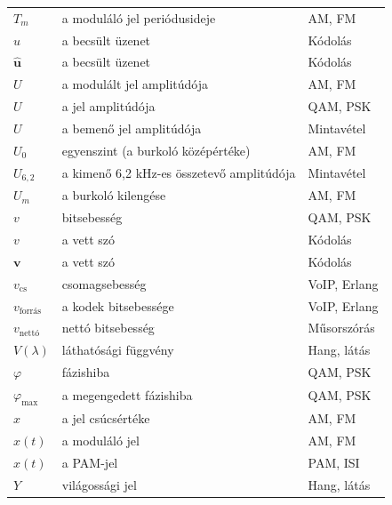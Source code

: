 {\begin{longtable}{@{}>{\raggedright\arraybackslash}p{2.4cm}>{\raggedright\arraybackslash}p{8.2cm}>{\raggedright\arraybackslash}p{3.8cm}@{}}
$T_m$ & a moduláló jel periódusideje & AM, FM\\
$\hat u$ & a becsült üzenet & Kódolás\\
$\hat{\mathbf u}$ & a becsült üzenet & Kódolás\\
$U$ & a modulált jel amplitúdója & AM, FM\\
$U$ & a jel amplitúdója & QAM, PSK\\
$U$ & a bemenő jel amplitúdója & Mintavétel\\
$U_0$ & egyenszint (a burkoló középértéke) & AM, FM\\
$U_{6{,}2}$ & a kimenő 6,2 kHz-es összetevő amplitúdója & Mintavétel\\
$U_m$ & a burkoló kilengése & AM, FM\\
$v$ & bitsebesség & QAM, PSK\\
$v$ & a vett szó & Kódolás\\
$\mathbf v$ & a vett szó & Kódolás\\
$v_\text{cs}$ & csomagsebesség & VoIP, Erlang\\
$v_\text{forrás}$ & a kodek bitsebessége & VoIP, Erlang\\
$v_\text{nettó}$ & nettó bitsebesség & Műsorszórás\\
$V(\lambda)$ & láthatósági függvény & Hang, látás\\
$\varphi$ & fázishiba & QAM, PSK\\
$\varphi_{\max}$ & a megengedett fázishiba & QAM, PSK\\
$\hat x$ & a jel csúcsértéke & AM, FM\\
$x(t)$ & a moduláló jel & AM, FM\\
$x(t)$ & a PAM-jel & PAM, ISI\\
$Y$ & világossági jel & Hang, látás\\
\bottomrule\end{longtable}}











